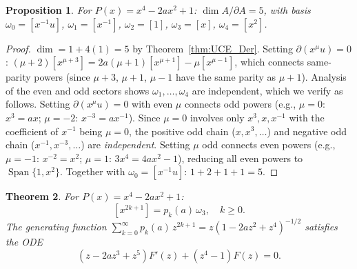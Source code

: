 \documentclass[11pt]{amsart}
\newtheorem{theorem}{Theorem}[section]
\newtheorem{proposition}[theorem]{Proposition}
\theoremstyle{definition}
\theoremstyle{remark}
\newcommand{\pa}{\partial}
\DeclareMathOperator{\Span}{Span}
\begin{document}
\begin{proposition}\label{prop:quartic_basis}
For $P(x) = x^4-2ax^2+1$: $\dim A/\pa A = 5$, with basis
$\omega_0 = [x^{-1}u]$, $\omega_1=[x^{-1}]$,
$\omega_2=[1]$, $\omega_3=[x]$, $\omega_4=[x^2]$.
\end{proposition}

\begin{proof}
$\dim = 1 + 4(1) = 5$ by Theorem~\ref{thm:UCE_Der}.
Setting $\pa(x^\mu u)=0$:
$(\mu+2)[x^{\mu+3}] = 2a(\mu+1)[x^{\mu+1}] - \mu[x^{\mu-1}]$,
which connects same-parity powers (since $\mu+3$, $\mu+1$, $\mu-1$
have the same parity as $\mu+1$).
Analysis of the even and odd sectors shows $\omega_1,\ldots,\omega_4$
are independent, which we verify as follows.
Setting $\pa(x^\mu u) = 0$ with even $\mu$ connects odd powers
(e.g., $\mu=0$: $x^3 = ax$; $\mu=-2$: $x^{-3}=ax^{-1}$).
Since $\mu=0$ involves only $x^3,x,x^{-1}$ with the coefficient of
$x^{-1}$ being $\mu=0$, the positive odd chain ($x,x^3,\ldots$) and
negative odd chain ($x^{-1},x^{-3},\ldots$) are \emph{independent}.
Setting $\mu$ odd connects even powers (e.g., $\mu=-1$: $x^{-2}=x^2$;
$\mu=1$: $3x^4 = 4ax^2-1$), reducing all even powers to
$\Span\{1,x^2\}$.
Together with $\omega_0 = [x^{-1}u]$: $1+2+1+1=5$.
\end{proof}

\begin{theorem}\label{thm:quartic_odd}
For $P(x) = x^4-2ax^2+1$:
\begin{equation}\label{eq:quartic_legendre}
  [x^{2k+1}] = p_k(a)\,\omega_3, \quad k\geq 0.
\end{equation}
The generating function $\sum_{k=0}^\infty p_k(a)\,z^{2k+1}
= z(1-2az^2+z^4)^{-1/2}$
satisfies the ODE
\begin{equation}\label{eq:quartic_ODE}
  (z-2az^3+z^5)F'(z) + (z^4-1)F(z) = 0.
\end{equation}
\end{theorem}
\end{document}
